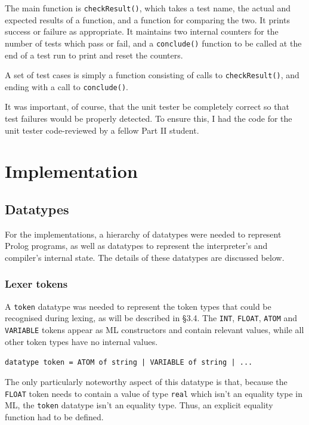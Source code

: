 \documentclass[12pt]{article}
\begin{document}
The main function is \verb|checkResult()|, which takes a test name, the actual and expected results of a function, and a function for comparing the two. 
It prints success or failure as appropriate. 
It maintains two internal counters for the number of tests which pass or fail, and a \verb|conclude()| function to be called at the end of a test run to print and reset the counters.

A set of test cases is simply a function consisting of calls to \verb|checkResult()|, and ending with a call to \verb|conclude()|.

It was important, of course, that the unit tester be completely correct so that test failures would be properly detected. 
To ensure this, I had the code for the unit tester code-reviewed by a fellow Part II student.

\newpage

\section{Implementation}


\subsection{Datatypes}

For the implementations, a hierarchy of datatypes were needed to represent Prolog programs, as well as datatypes to represent the interpreter's and compiler's internal state. The details of these datatypes are discussed below.

\subsubsection{Lexer tokens}

A \verb|token| datatype was needed to represent the token types that could be recognised during lexing, as will be described in \S3.4. 
The \verb|INT|, \verb|FLOAT|, \verb|ATOM| and \verb|VARIABLE| tokens appear as ML constructors and contain relevant values, while all other token types have no internal values. 

\verb/datatype token = ATOM of string | VARIABLE of string | .../

The only particularly noteworthy aspect of this datatype is that, because the \verb|FLOAT| token needs to contain a value of type \verb|real| which isn't an equality type in ML, the \verb|token| datatype isn't an equality type. 
Thus, an explicit equality function had to be defined.
\end{document}
